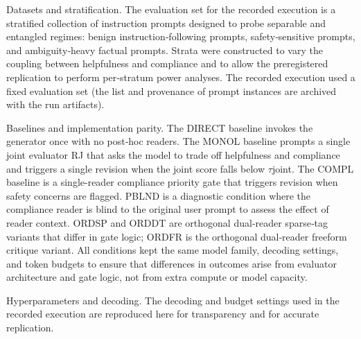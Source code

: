 \documentclass{article}
\begin{document}
Datasets and stratification. The evaluation set for the recorded execution is a stratified collection of instruction prompts designed to probe separable and entangled regimes: benign instruction‑following prompts, safety‑sensitive prompts, and ambiguity‑heavy factual prompts. Strata were constructed to vary the coupling between helpfulness and compliance and to allow the preregistered replication to perform per‑stratum power analyses. The recorded execution used a fixed evaluation set (the list and provenance of prompt instances are archived with the run artifacts).

Baselines and implementation parity. The DIRECT baseline invokes the generator once with no post‑hoc readers. The MONOL baseline prompts a single joint evaluator RJ that asks the model to trade off helpfulness and compliance and triggers a single revision when the joint score falls below $\tau$joint. The COMPL baseline is a single-reader compliance priority gate that triggers revision when safety concerns are flagged. PBLND is a diagnostic condition where the compliance reader is blind to the original user prompt to assess the effect of reader context. ORDSP and ORDDT are orthogonal dual‑reader sparse‑tag variants that differ in gate logic; ORDFR is the orthogonal dual‑reader freeform critique variant. All conditions kept the same model family, decoding settings, and token budgets to ensure that differences in outcomes arise from evaluator architecture and gate logic, not from extra compute or model capacity.

Hyperparameters and decoding. The decoding and budget settings used in the recorded execution are reproduced here for transparency and for accurate replication.

\begin{table}[ht]
\centering
\caption{Hyperparameter settings}
\label{tab:1}
\end{table}
\end{document}
